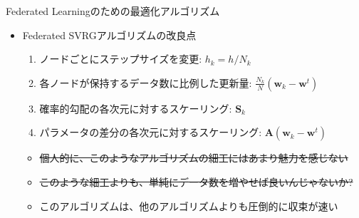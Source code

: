 \documentclass[dvipdfmx,notheorems,t]{beamer}
\begin{document}
\begin{frame}{Federated Learningのための最適化アルゴリズム}

\begin{itemize}
	\item Federated SVRGアルゴリズムの改良点
	\begin{enumerate}
		\item ノードごとにステップサイズを変更: $h_k = h / N_k$
		\item 各ノードが保持するデータ数に比例した更新量: $\frac{N_k}{N} \left( \bm{w}_k - \bm{w}^t \right)$
		\item 確率的勾配の各次元に対するスケーリング: $\bm{S}_k$
		\item パラメータの差分の各次元に対するスケーリング: $\bm{A} \left( \bm{w}_k - \bm{w}^t \right)$
	\end{enumerate}
	
	\begin{itemize}
		\item \sout{個人的に、このようなアルゴリズムの細工にはあまり魅力を感じない}
		\item \sout{このような細工よりも、単純にデータ数を増やせば良いんじゃないか?}
		\newline
		
		\item このアルゴリズムは、他のアルゴリズムよりも圧倒的に収束が速い
	\end{itemize}
\end{itemize}

\end{frame}
\end{document}
